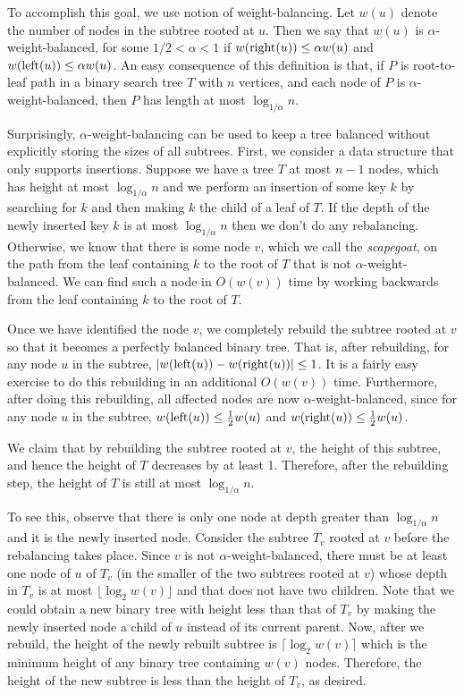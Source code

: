 To accomplish this goal, we use notion of weight-balancing. Let $w(u)$
denote the number of nodes in the subtree rooted at $u$.  Then we say
that $w(u)$ is $\alpha$-weight-balanced, for some $1/2 < \alpha < 1$
if $w(\mathrm{right}(u)) \le \alpha w(u)$ and $w(\mathrm{left}(u))\le \alpha w(u)$.  An
easy consequence of this definition is that, if $P$ is root-to-leaf
path in a binary search tree $T$ with $n$ vertices, and each node of
$P$ is $\alpha$-weight-balanced, then $P$ has length at most
$\log_{1/\alpha} n$.

Surprisingly, $\alpha$-weight-balancing can be used to keep a tree
balanced without explicitly storing the sizes of all subtrees.  First,
we consider a data structure that only supports insertions.  Suppose
we have a tree $T$ at most $n-1$ nodes, which has height at most
$\log_{1/\alpha} n$ and we perform an insertion of some key $k$ by
searching for $k$ and then making $k$ the child of a leaf of $T$.  If
the depth of the newly inserted key $k$ is at most $\log_{1/\alpha} n$
then we don't do any rebalancing.  Otherwise, we know that there is
some node $v$, which we call the \emph{scapegoat}, on the path from
the leaf containing $k$ to the root of $T$ that is not
$\alpha$-weight-balanced.  We can find such a node in $O(w(v))$ time
by working backwards from the leaf containing $k$ to the root of $T$.

Once we have identified the node $v$, we completely rebuild the
subtree rooted at $v$ so that it becomes a perfectly balanced binary
tree.  That is, after rebuilding, for any node $u$ in the subtree,
$|w(\mathrm{left}(u))-w(\mathrm{right}(u))| \le 1$.  It is a fairly easy exercise to do
this rebuilding in an additional $O(w(v))$ time.  Furthermore, after
doing this rebuilding, all affected nodes are now
$\alpha$-weight-balanced, since for any node $u$ in the subtree,
$w(\mathrm{left}(u))\le \frac{1}{2}w(u)$ and $w(\mathrm{right}(u))\le \frac{1}{2}w(u)$.

We claim that by rebuilding the subtree rooted at $v$, the height of
this subtree, and hence the height of $T$ decreases by at least 1.
Therefore, after the rebuilding step, the height of $T$ is still at
most $\log_{1/\alpha } n$.

To see this, observe that there is only one node at depth greater than
$\log_{1/\alpha} n$ and it is the newly inserted node.  Consider the
subtree $T_v$ rooted at $v$ before the rebalancing takes place.  Since
$v$ is not $\alpha$-weight-balanced, there must be at least one node
of $u$ of $T_v$ (in the smaller of the two subtrees rooted at $v$)
whose depth in $T_v$ is at most $\lfloor\log_2 w(v)\rfloor$ and that
does not have two children.  Note that we could obtain a new binary
tree with height less than that of $T_v$ by making the newly inserted
node a child of $u$ instead of its current parent.  Now, after we
rebuild, the height of the newly rebuilt subtree is $\lceil\log_2
w(v)\rceil$ which is the minimum height of any binary tree containing
$w(v)$ nodes.  Therefore, the height of the new subtree is less than
the height of $T_v$, as desired.

